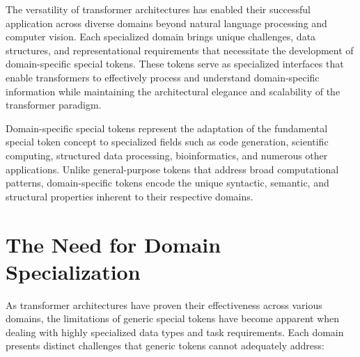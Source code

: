 
The versatility of transformer architectures has enabled their successful application across diverse domains beyond natural language processing and computer vision. Each specialized domain brings unique challenges, data structures, and representational requirements that necessitate the development of domain-specific special tokens. These tokens serve as specialized interfaces that enable transformers to effectively process and understand domain-specific information while maintaining the architectural elegance and scalability of the transformer paradigm.
\begin{comment}
Feedback: This is a strong opening. To make it even more compelling, you could frame it as moving from generalist to specialist. For example: "Having established the general-purpose tokens that form the foundation of language and vision models, we now turn to the world of specialists. This chapter explores how the core ideas of special tokens are adapted to domains with their own unique languages and rules—from the rigid syntax of computer code to the complex hierarchies of structured databases."
\end{comment}

Domain-specific special tokens represent the adaptation of the fundamental special token concept to specialized fields such as code generation, scientific computing, structured data processing, bioinformatics, and numerous other applications. Unlike general-purpose tokens that address broad computational patterns, domain-specific tokens encode the unique syntactic, semantic, and structural properties inherent to their respective domains.

\section{The Need for Domain Specialization}

As transformer architectures have proven their effectiveness across various domains, the limitations of generic special tokens have become apparent when dealing with highly specialized data types and task requirements. Each domain presents distinct challenges that generic tokens cannot adequately address:

